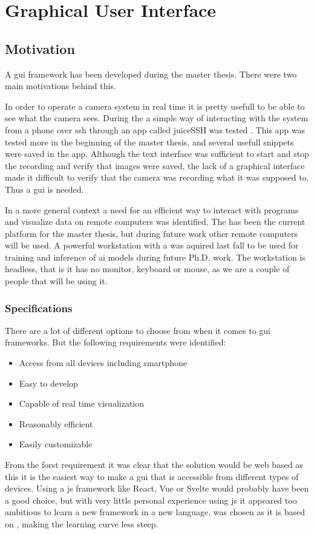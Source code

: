 \chapter{Graphical User Interface}

\section{Motivation}
A \gls{gui} framework has been developed during the master thesis.
There were two main motivations behind this.

In order to operate a camera system in real time it is pretty usefull to be able to see what the camera sees.
During the \preproject a simple way of interacting with the system from a phone over \gls{ssh} through an app called juiceSSH was tested \cite[32]{martensPortableSensorRig2022}.
This app was tested more in the beginning of the master thesis, and several usefull snippets were saved in the app.
Although the text interface was sufficient to start and stop the recording and verify that images were saved, the lack of a graphical interface made it difficult to verify that the camera was recording what it was supposed to.
Thus a \gls{gui} is needed.

In a more general context a need for an efficient way to interact with programs and visualize data on remote computers was identified.
The \jx has been the current platform for the master thesis, but during future work other remote computers will be used.
A powerful workstation with a \todo was aquired last fall to be used for training and inference of \gls{ai} models during future Ph.D. work.
The workstation is headless, that is it has no monitor, keyboard or mouse, as we are a couple of people that will be using it.

\subsection{Specifications}
There are a lot of different options to choose from when it comes to \gls{gui} frameworks.
But the following requirements were identified:
\begin{itemize}
    \item Access from all devices including smartphone
    \item Easy to develop
    \item Capable of real time visualization
    \item Reasonably efficient
    \item Easily customizable
\end{itemize}
From the forst requirement it was clear that the solution would be web based as this it is the easiest way to make a \gls{gui} that is accessible from different types of devices.
Using a \gls{js} framework like React, Vue or Svelte would probably have been a good choice, but with very little personal experience using \gls{js} it appeared too ambitious to learn a new framework in a new language.
\dash was chosen as it is based on \py, making the learning curve less steep.


